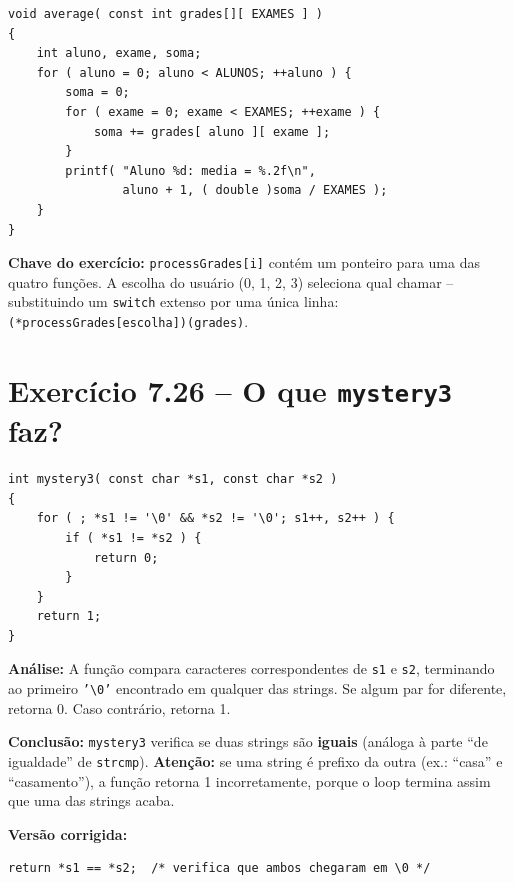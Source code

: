 \documentclass[12pt,a4paper]{article}
\begin{document}
\begin{respostabox}
\begin{lstlisting}
void average( const int grades[][ EXAMES ] )
{
    int aluno, exame, soma;
    for ( aluno = 0; aluno < ALUNOS; ++aluno ) {
        soma = 0;
        for ( exame = 0; exame < EXAMES; ++exame ) {
            soma += grades[ aluno ][ exame ];
        }
        printf( "Aluno %d: media = %.2f\n",
                aluno + 1, ( double )soma / EXAMES );
    }
}
\end{lstlisting}

\textbf{Chave do exercício:} \texttt{processGrades[i]} contém um ponteiro para
uma das quatro funções. A escolha do usuário (0, 1, 2, 3) seleciona qual chamar --
substituindo um \texttt{switch} extenso por uma única linha:
\texttt{(*processGrades[escolha])(grades)}.
\end{respostabox}

\newpage

\section{Exercício 7.26 -- O que \texttt{mystery3} faz?}

\begin{respostabox}
\begin{lstlisting}
int mystery3( const char *s1, const char *s2 )
{
    for ( ; *s1 != '\0' && *s2 != '\0'; s1++, s2++ ) {
        if ( *s1 != *s2 ) {
            return 0;
        }
    }
    return 1;
}
\end{lstlisting}

\textbf{Análise:} A função compara caracteres correspondentes de \texttt{s1} e
\texttt{s2}, terminando ao primeiro \texttt{'\textbackslash 0'} encontrado em
qualquer das strings. Se algum par for diferente, retorna 0. Caso contrário,
retorna 1.

\textbf{Conclusão:} \texttt{mystery3} verifica se duas strings são \textbf{iguais}
(análoga à parte ``de igualdade'' de \texttt{strcmp}). \textbf{Atenção:} se uma
string é prefixo da outra (ex.: ``casa'' e ``casamento''), a função retorna 1
incorretamente, porque o loop termina assim que uma das strings acaba.

\textbf{Versão corrigida:}
\begin{lstlisting}
return *s1 == *s2;  /* verifica que ambos chegaram em \0 */
\end{lstlisting}
\end{respostabox}

\end{document}
